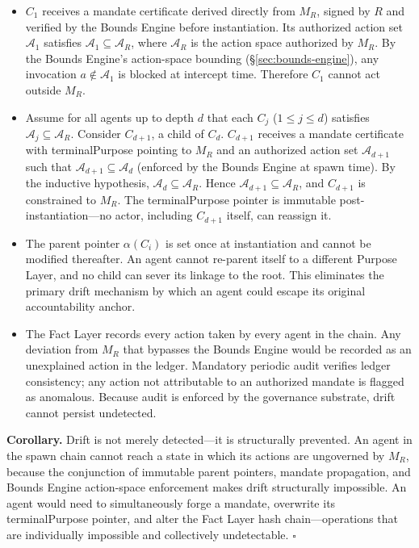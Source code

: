 \begin{itemize}
    \item[\textbf{Base case ($i=1$).}] $C_1$ receives a mandate certificate derived directly from $M_R$, signed by $R$ and verified by the Bounds Engine before instantiation. Its authorized action set $\mathcal{A}_1$ satisfies $\mathcal{A}_1 \subseteq \mathcal{A}_R$, where $\mathcal{A}_R$ is the action space authorized by $M_R$. By the Bounds Engine's action-space bounding (\S\ref{sec:bounds-engine}), any invocation $a \notin \mathcal{A}_1$ is blocked at intercept time. Therefore $C_1$ cannot act outside $M_R$.

    \item[\textbf{Inductive step.}] Assume for all agents up to depth $d$ that each $C_j$ ($1 \leq j \leq d$) satisfies $\mathcal{A}_j \subseteq \mathcal{A}_R$. Consider $C_{d+1}$, a child of $C_d$. $C_{d+1}$ receives a mandate certificate with terminalPurpose pointing to $M_R$ and an authorized action set $\mathcal{A}_{d+1}$ such that $\mathcal{A}_{d+1} \subseteq \mathcal{A}_d$ (enforced by the Bounds Engine at spawn time). By the inductive hypothesis, $\mathcal{A}_d \subseteq \mathcal{A}_R$. Hence $\mathcal{A}_{d+1} \subseteq \mathcal{A}_R$, and $C_{d+1}$ is constrained to $M_R$. The terminalPurpose pointer is immutable post-instantiation—no actor, including $C_{d+1}$ itself, can reassign it.

    \item[\textbf{Immutable parent pointer.}] The parent pointer $\alpha(C_i)$ is set once at instantiation and cannot be modified thereafter. An agent cannot re-parent itself to a different Purpose Layer, and no child can sever its linkage to the root. This eliminates the primary drift mechanism by which an agent could escape its original accountability anchor.

    \item[\textbf{Forensic ledger detection.}] The Fact Layer records every action taken by every agent in the chain. Any deviation from $M_R$ that bypasses the Bounds Engine would be recorded as an unexplained action in the ledger. Mandatory periodic audit verifies ledger consistency; any action not attributable to an authorized mandate is flagged as anomalous. Because audit is enforced by the governance substrate, drift cannot persist undetected.
\end{itemize}

\medskip\noindent
\textbf{Corollary.} Drift is not merely detected—it is structurally prevented. An agent in the spawn chain cannot reach a state in which its actions are ungoverned by $M_R$, because the conjunction of immutable parent pointers, mandate propagation, and Bounds Engine action-space enforcement makes drift structurally impossible. An agent would need to simultaneously forge a mandate, overwrite its terminalPurpose pointer, and alter the Fact Layer hash chain—operations that are individually impossible and collectively undetectable. $\square$


